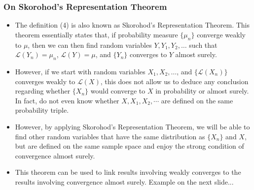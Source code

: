 \documentclass[handout]{beamer}
\begin{document}
\frame
{
  \frametitle{On Skorohod's Representation Theorem} 

   \begin{itemize}
          
                     
                     \item<1-> The definition (4) is also known as Skorohod's Representation Theorem. This theorem essentially states that, if probability measure $\{\mu_n\}$ converge weakly to $\mu$, then we can then find random variables $Y, Y_1, Y_2,\ldots$ such that $\mathcal{L} (Y_n) =\mu_n$, $\mathcal{L} (Y) =\mu$, and $\{Y_n\}$ converges to $Y$ almost surely. 
                     
           
\item<2->  However, if we start with random variables $X_1, X_2, \ldots$, and $\{ \mathcal{L} (X_n) \}$converges weakly to $\mathcal{L} (X)$, this does not allow us to deduce any conclusion regarding whether  $\{X_n\}$ would converge to $X$ in probability or almost surely. In fact, do not even know whether $X, X_1, X_2,\cdots$ are defined on the same probability triple.  

\item<3-> However, by applying  Skorohod's Representation Theorem, we will be able to find other random variables that have the same distribution as $\{X_n\}$ and ${X}$, but are defined on the same sample space and enjoy the strong condition of convergence almost surely. 
                              
\item<4-> This theorem can be used to link results involving weakly converges to the results involving convergence almost surely. Example on the next slide...        
                                                                                                            
                                               \end{itemize}
}
\end{document}
